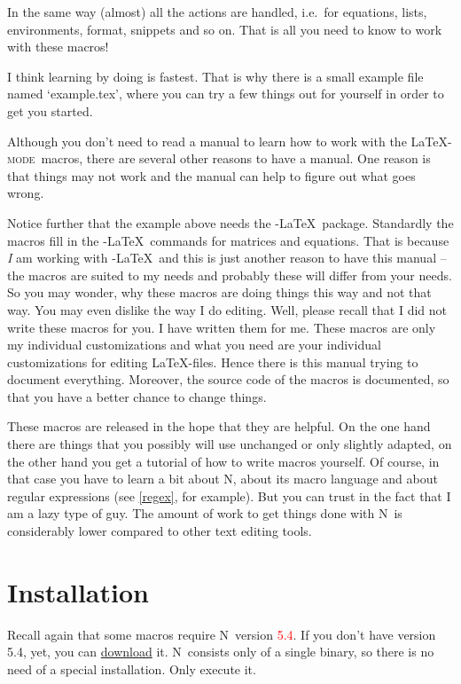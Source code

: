 \documentclass{article}
\newcommand{\latexpack}{\LaTeX-\textsc{mode}}
\newcommand{\nedit}{N\kern-0.8pt{Edit}}
\begin{document}
In the same way (almost) all the actions are handled, i.e.~for equations, lists, environments, format, snippets and so on. That is all you need to know to work with these macros!

I think learning by doing is fastest. That is why there is a small example file named `example.tex', where you can try a few things out for yourself in order to get you started.

Although you don't need to read a manual to learn how to work with the \latexpack\ macros, there are several other reasons to have a manual. One reason is that things may not work and the manual can help to figure out what goes wrong. 

Notice further that the example above needs the \AmS-\LaTeX\ package. Standardly the macros fill in the \AmS-\LaTeX\ commands for matrices and equations. That is because \emph{I} am working with \AmS-\LaTeX\ and this is just another reason to have this manual -- the macros are suited to my needs and probably these will differ from your needs. So you may wonder, why these macros are doing things this way and not that way. You may even dislike the way I do editing. Well, please recall that I did not write these macros for you. I have written them for me. These macros are only my individual customizations and what you need are your individual customizations for editing \LaTeX-files. Hence there is this manual trying to document everything. Moreover, the source code of the macros is documented, so that you have a better chance to change things.

These macros are released in the hope that they are helpful. On the one hand there are things that you possibly will use unchanged or only slightly adapted, on the other hand you get a tutorial of how to write macros yourself.
Of course, in that case you have to learn a bit about \nedit, about its macro language and about regular expressions (see \ref{regex}, for example). But you can trust in the fact that I am a lazy type of guy. The amount of work to get things done with \nedit\ is considerably lower compared to other text editing tools.


\newpage
\section{Installation}
Recall again that some macros require \nedit\ version \textcolor{red}{5.4}. If you don't have version 5.4, yet, you can \href{http://www.nedit.org/ftp/}{download} it.
\nedit\ consists only of a single binary, so there is no need of a special installation. Only execute it.
\end{document}
